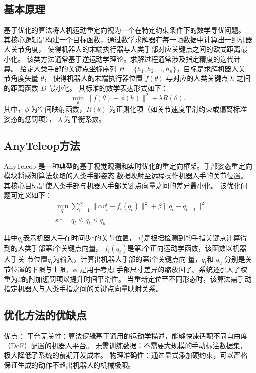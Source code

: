 \subsection{基本原理}
基于优化的算法将人机运动重定向视为一个在特定约束条件下的数学寻优问题。
其核心逻辑是构建一个目标函数，通过数学求解器在每一帧数据中计算出一组机器人关节角度，
使得机器人的末端执行器与人类手部对应关键点之间的欧式距离最小化。
该类方法通常基于逆运动学理论。求解过程通常涉及指定精度的迭代计算。
给定人类手部的关键点坐标序列 $H = \{h_1, h_2, \dots, h_n\}$，目标是求解机器人关节角度矢量 $\theta$，
使得机器人的末端执行器位置 $f(\theta)$ 与对应的人类关键点 $h$ 之间的距离函数 $D$ 最小化。
其标准的数学表达形式如下：
$$\min_{\theta} \|f(\theta) - \phi(h)\|^2 + \lambda R(\theta).$$
其中，$\phi$ 为空间映射函数，$R(\theta)$ 为正则化项（如关节速度平滑约束或偏离标准姿态的惩罚项），
$\lambda$ 为平衡系数。
\subsection{AnyTeleop方法}
AnyTeleop 是一种典型的基于视觉观测和实时优化的重定向框架。手部姿态重定向模块将感知算法获取的人类手部姿态
数据映射至远程操作机器人手的关节位置。其核心目标是使人类手部与机器人手部关键点向量之间的差异最小化。
该优化问题可定义如下：
\begin{equation}
\begin{aligned}
& \min_{q_t} \sum_{i=1}^{N} \| \alpha v_i^t - f_i(q_t) \|^2 + \beta \| q_t - q_{t-1} \|^2 \\
& \text{s.t.} \quad q_l \leq q_t \leq q_u.
\end{aligned}
\end{equation}

其中$q_t$表示机器人手在时间步t的关节位置，
$v_i^t$是根据检测到的手指关键点计算得到的人类手部第i个关键点向量，
$f_i(q_t)$是第i个正向运动学函数，该函数以机器人手关
节位置$q_t$为输入，计算出机器人手部的第i个关键点向
量，$q_l$和 $q_u$ 分别是关节位置的下限与上限，$\alpha$ 是用于考虑
手部尺寸差异的缩放因子。系统还引入了权重为$\beta$的附加惩罚项以提升时间平滑性。
当重新定位至不同形态时，该算法需手动指定机器人与人类手指之间的关键点向量映射关系。
\subsection{优化方法的优缺点}
优点：
平台无关性：算法逻辑基于通用的运动学描述，能够快速适配不同自由度（DoF）配置的机器人平台。
无需训练数据：不需要大规模的手动标注数据集，极大降低了系统的前期开发成本。
物理准确性：通过显式添加硬约束，可以严格保证生成的动作不超出机器人的机械极限。


